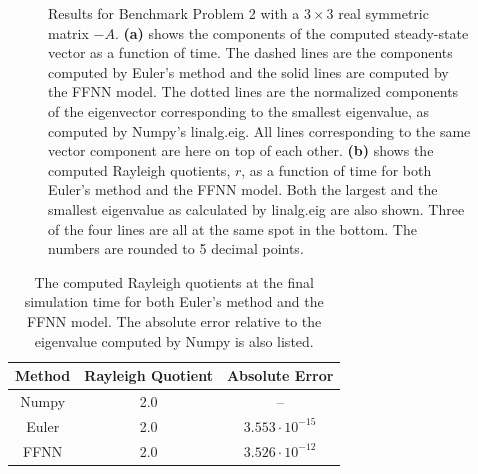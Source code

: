 \begin{figure}[H]
\centering
{}
\qquad
{}
\caption{Results for Benchmark Problem 2 with a $3\times 3$ real symmetric matrix $-A$. \textbf{(a)} shows the components of the computed steady-state vector as a function of time. The dashed lines are the components computed by Euler's method and the solid lines are computed by the FFNN model. The dotted lines are the normalized components of the eigenvector corresponding to the smallest eigenvalue, as computed by Numpy's linalg.eig. All lines corresponding to the same vector component are here on top of each other. \textbf{(b)} shows the computed Rayleigh quotients, $r$, as a function of time for both Euler's method and the FFNN model. Both the largest and the smallest eigenvalue as calculated by linalg.eig are also shown. Three of the four lines are all at the same spot in the bottom. The numbers are rounded to 5 decimal points.}
\label{fig:benchrun3}
\end{figure}

\begin{table}[H]
\caption{The computed Rayleigh quotients at the final simulation time for both Euler's method and the FFNN model. The absolute error relative to the eigenvalue computed by Numpy is also listed.}
\centering
{}
\begin{tabular}{c|c|c}
\hline
\hline 
Method & Rayleigh Quotient & Absolute Error
\\
\hline 
\hline 
Numpy & 2.0 & –
\\
Euler & 2.0 & $3.553 \cdot 10^{-15}$  
\\
FFNN & 2.0 & $3.526 \cdot 10^{-12}$
\\
\hline
\hline 
\end{tabular}
\label{tab:eigbench3}
\end{table}

